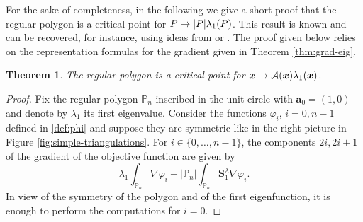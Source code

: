 \documentclass[JEP,XML,SOM,Unicode,ThmDefs,NoFloatCountersInSection,published]{cedram}
\def\mto{\mathchoice{\longmapsto}{\mapsto}{\mapsto}{\mapsto}}
\theoremstyle{plain}
\newtheorem{thm}{Theorem}[section]
\theoremstyle{definition}
\newcommand{\bo}[1]{{\boldsymbol#1}}
\let\Bbb\mathbb
\begin{document}
For the sake of completeness, in the following we give a short proof that the regular polygon is a critical point for $P\mto |P|\lambda_1(P)$. This result is known and can be recovered, for instance, using ideas from \cite{FragalaVelichkov19} or \cite[Ch.\,1]{beniphd}. The proof given below relies on the representation formulas for the gradient given in Theorem \ref{thm:grad-eig}.

\begin{thm}
The regular polygon is a critical point for $\bo x \mto \mathcal A(\bo x)\lambda_1(\bo x)$.
\label{thm:critical-point}
\end{thm}

\begin{proof}
Fix the regular polygon $\Bbb P_n$ inscribed in the unit circle with $\bo a_0 = (1,0)$ and denote by $\lambda_1$ its first eigenvalue.
Consider the functions $\varphi_i$, $i=0,n-1$ defined in \eqref{def:phi} and suppose they are symmetric like in the right picture in Figure \ref{fig:simple-triangulations}. For $i \in \{0,\dots,n-1\}$, the components $2i, 2i+1$ of the gradient of the objective function are given by
\[
\lambda_1 \int_{\Bbb P_n} \nabla \varphi_i + |\Bbb P_n| \int_{\Bbb P_n} \bo S_1^\lambda \nabla \varphi_i.
\]
In view of the symmetry of the polygon and of the first eigenfunction, it is enough to perform the computations for $i=0$.


\end{proof}
\end{document}
